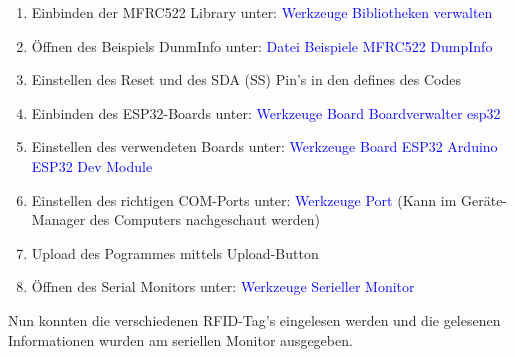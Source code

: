 \begin{enumerate}
\item Einbinden der MFRC522 Library unter: \textcolor{blue}{Werkzeuge \textrightarrow Bibliotheken verwalten} \newline
\item Öffnen des Beispiels DunmInfo unter: \textcolor{blue}{Datei \textrightarrow Beispiele \textrightarrow MFRC522 \textrightarrow DumpInfo} \newline
\item Einstellen des Reset und des SDA (SS) Pin's in den defines des Codes\newline
\item Einbinden des ESP32-Boards unter: \textcolor{blue}{Werkzeuge \textrightarrow Board \textrightarrow Boardverwalter \textrightarrow esp32} \newline
\item Einstellen des verwendeten Boards unter: \textcolor{blue}{Werkzeuge \textrightarrow Board \textrightarrow ESP32 Arduino \textrightarrow ESP32 Dev Module} \newline
\item Einstellen des richtigen COM-Ports unter: \textcolor{blue}{Werkzeuge \textrightarrow Port} (Kann im Geräte-Manager des Computers nachgeschaut werden) \newline
\item Upload des Pogrammes mittels Upload-Button \newline
\item Öffnen des Serial Monitors unter: \textcolor{blue}{Werkzeuge \textrightarrow  Serieller Monitor} \newline
\end{enumerate}

Nun konnten die verschiedenen RFID-Tag's eingelesen werden und  die gelesenen Informationen wurden am seriellen Monitor ausgegeben. \cite{pcbreflux_esp32_2017}




